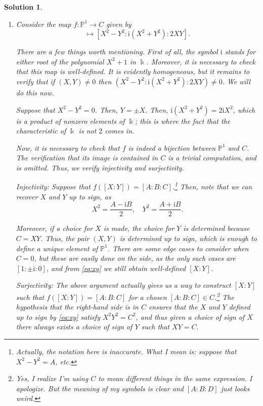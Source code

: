\documentclass{article}
\theoremstyle{nonumberplain}
\newtheorem{sol}{Solution}
\newcommand{\kk}{\Bbbk}
\newcommand{\PP}{\mathbb{P}}
\newcommand{\I}{\mathrm{i}}
\begin{document}
\begin{sol}
\begin{enumerate}
\item Consider the map $f \colon \PP^1 \to C$ given by
\begin{equation}
[X:Y] \mapsto [X^2 - Y^2 : \I(X^2 + Y^2) : 2XY].
\end{equation}

There are a few things worth mentioning. First of all, the symbol $\I$ stands for either root of the polynomial $X^2 + 1$ in $\kk$. Moreover, it is necessary to check that this map is well-defined. It is evidently homogeneous, but it remains to verify that if $(X,Y) \neq 0$ then $(X^2 - Y^2 : \I(X^2 + Y^2) : 2XY) \neq 0$. We will do this now.

Suppose that $X^2 - Y^2 = 0$. Then, $Y = \pm X$. Then, $\I (X^2 + Y^2) = 2 \I X^2$, which is a product of nonzero elements of $\kk$; this is where the fact that the characteristic of $\kk$ is not $2$ comes in.

Now, it is necessary to check that $f$ is indeed a bijection between $\PP^1$ and $C$. The verification that its image is contained in $C$ is a trivial computation, and is omitted. Thus, we verify injectivity and surjectivity.

Injectivity: Suppose that $f([X:Y]) = [A:B:C]$.\footnote{Actually, the notation here is inaccurate. What I mean is: suppose that $X^2 - Y^2 = A$, etc.} Then, note that we can recover $X$ and $Y$ up to sign, as
\begin{equation}\label{eq:xy}
X^2 = \frac{A-\I B}2, \quad Y^2 = \frac{A + \I B}2.
\end{equation}

Moreover, if a choice for $X$ is made, the choice for $Y$ is determined because $C = XY$. Thus, the pair $(X,Y)$ is determined up to sign, which is enough to define a unique element of $\PP^1$. There are some edge cases to consider when $C = 0$, but these are easily done on the side, as the only such cases are $[1:\pm \I:0]$, and from \eqref{eq:xy} we still obtain well-defined $[X:Y]$.

Surjectivity: The above argument actually gives us a way to construct $[X:Y]$ such that $f([X:Y]) = [A:B:C]$ for a chosen $[A:B:C] \in C$.\footnote{Yes, I realize I'm using $C$ to mean different things in the same expression. I apologize. But the meaning of my symbols is clear and $[A:B:D]$ just looks weird.} The hypothesis that the right-hand side is in $C$ ensures that the $X$ and $Y$ defined up to sign by \eqref{eq:xy} satisfy $X^2 Y^2 = C^2$, and thus given a choice of sign of $X$ there always exists a choice of sign of $Y$ such that $XY = C$.


\end{enumerate}
\end{sol}
\end{document}
